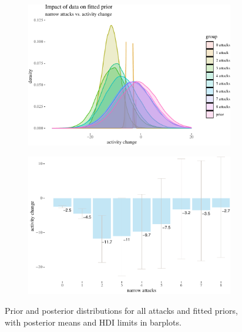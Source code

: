 \documentclass[10pt,]{scrartcl}
\begin{document}
\begin{figure}[!ht]
\begin{subfigure}[!ht]{0.9\textwidth}

\begin{center}\includegraphics[width=1\linewidth]{redditAnalysisWalkthrough_files/figure-latex/unnamed-chunk-59-1} \end{center}
\end{subfigure} 


\begin{subfigure}[!ht]{0.9\textwidth}

\begin{center}\includegraphics[width=1\linewidth]{redditAnalysisWalkthrough_files/figure-latex/unnamed-chunk-60-1} \end{center}
\end{subfigure}
\caption{Prior and posterior distributions for all attacks and fitted priors, with posterior means and HDI limits in barplots.}
\label{fig:bayesian2}
\end{figure}
\end{document}
